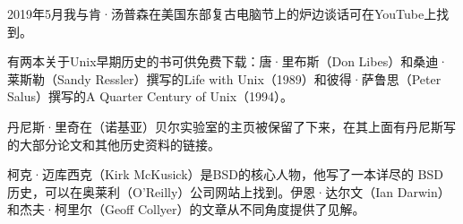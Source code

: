 \documentclass[a4paper,12pt,UTF8,twoside]{ctexbook}
\begin{document}
2019年5月我与肯·汤普森在美国东部复古电脑节上的炉边谈话可在YouTube上找到。

有两本关于Unix早期历史的书可供免费下载：唐·里布斯（Don Libes）和桑迪·莱斯勒（Sandy Ressler）撰写的Life with Unix（1989）和彼得·萨鲁思（Peter Salus）撰写的A Quarter Century of Unix（1994）。

丹尼斯·里奇在（诺基亚）贝尔实验室的主页被保留了下来，在其上面有丹尼斯写的大部分论文和其他历史资料的链接。

柯克·迈库西克（Kirk McKusick）是BSD的核心人物，他写了一本详尽的 BSD 历史，可以在奥莱利（O’Reilly）公司网站上找到。伊恩·达尔文（Ian Darwin）和杰夫·柯里尔（Geoff Collyer）的文章从不同角度提供了见解。
\end{document}
